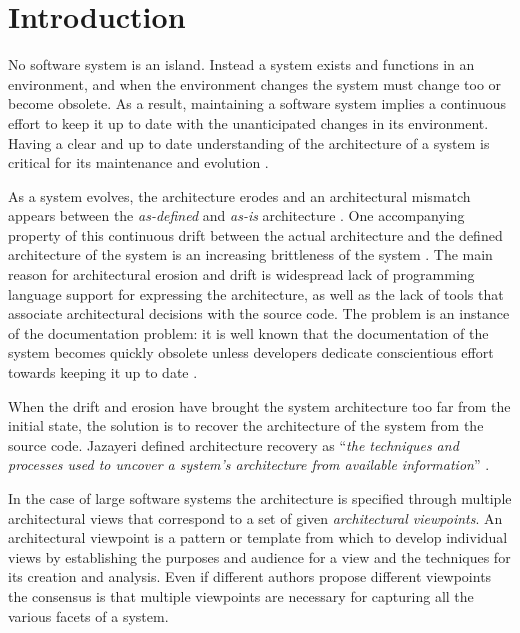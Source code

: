 \documentclass[preprint,12pt]{elsarticle}
\begin{document}

\section{Introduction} \label{sec:Introduction}

No software system is an island. Instead a system exists and functions in an environment, and when the environment changes the system must change too or become obsolete\cite{lehman-softev}. As a result, maintaining a software system implies a continuous effort to keep it up to date with the unanticipated changes in its environment. Having a clear and up to date understanding of the architecture of a system is critical for its maintenance and evolution \cite{Duca09c, pollet-sar}.

As a system evolves, the architecture erodes \cite{perry-foundations} and an architectural mismatch appears between the {\em as-defined} and {\em as-is} architecture \cite{garlan-mismatch}. One accompanying property of this continuous drift between the actual architecture and the defined architecture of the system is an increasing brittleness of the system \cite{perry-foundations}. The main reason for architectural erosion and drift is widespread lack of programming language support for expressing the architecture, as well as the lack of tools that associate architectural decisions with the source code. The problem is an instance of the documentation problem: it is well known that the documentation of the system becomes quickly obsolete unless developers dedicate conscientious effort towards keeping it up to date \cite{riva-report}.

When the drift and erosion have brought the system architecture too far from the initial state, the solution is to recover the architecture of the system from the source code. Jazayeri defined architecture recovery as ``{\em the techniques and processes used to uncover a system's architecture from available information}'' \cite{jaza-archevo}. 

In the case of large software systems the architecture is specified through multiple architectural views that correspond to a set of given {\em architectural viewpoints}. An architectural viewpoint is a pattern or template from which to develop individual views by establishing the purposes and audience for a view and the techniques for its creation and analysis. Even if different authors propose different viewpoints \cite{bass-architecture, kruchten-4plus, hof-apparch} the consensus is that multiple viewpoints are necessary for capturing all the various facets of a system.
\end{document}

